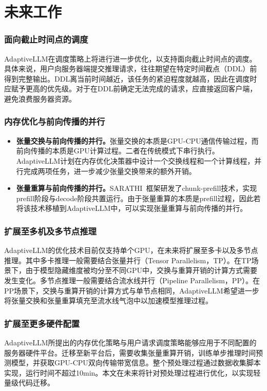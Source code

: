 \section{未来工作}

\subsubsection{面向截止时间点的调度}

AdaptiveLLM在调度策略上将进行进一步优化，以支持面向截止时间点的调度。具体来说，用户向服务器端提交推理请求，往往期望在特定时间截点（DDL）前得到完整输出。DDL离当前时间越近，该任务的紧迫程度就越高，因此在调度时应赋予更高的优先级。对于在DDL前确定无法完成的请求，应直接返回客户端，避免浪费服务器资源。

\subsubsection{内存优化与前向传播的并行}

\begin{itemize}

    \item \textbf{张量交换与前向传播的并行。}张量交换的本质是GPU-CPU通信传输过程，而前向传播的本质是GPU计算过程。二者在传统模式下串行执行。AdaptiveLLM计划在内存优化决策器中设计一个交换线程和一个计算线程，并行完成两项任务，进一步减少张量交换带来的额外开销。

    \item \textbf{张量重算与前向传播的并行。}SARATHI~\cite{SARATHI}框架研发了chunk-prefill技术，实现prefill阶段与decode阶段共置运行。由于张量重算的本质是prefill过程，因此若将该技术移植到AdaptiveLLM中，可以实现张量重算与前向传播的并行。

\end{itemize}

\subsubsection{扩展至多机及多节点推理} 

AdaptiveLLM的优化技术目前仅支持单个GPU，在未来将扩展至多卡以及多节点推理。其中多卡推理一般需要结合张量并行（Tensor Parallelism，TP）。在TP场景下，由于模型隐藏维度被均分至不同GPU中，交换与重算开销的计算方式需要发生变化。多节点推理一般需要结合流水线并行（Pipeline Parallelism，PP）。在PP场景下，交换与重算开销的计算方式与单节点相同，AdaptiveLLM希望进一步将张量交换和张量重算填充至流水线气泡中以加速模型推理过程。

\subsubsection{扩展至更多硬件配置}

AdaptiveLLM所提出的内存优化策略与用户请求调度策略能够应用于不同配置的服务器硬件平台。迁移至新平台后，需要收集张量重算开销，训练单步推理时间预测模型，并获取GPU-CPU双向传输带宽信息。整个预处理过程通过数据收集脚本实现，运行时间不超过10min。本文在未来将针对预处理过程进行优化，以实现轻量级代码迁移。

